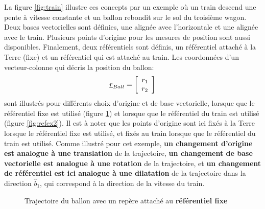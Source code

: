 La figure \ref{fig:train} illustre ces concepts par un exemple où un train descend une pente à vitesse constante et un ballon rebondit sur le sol du troisième wagon. Deux bases vectorielles sont définies, une alignée avec l'horizontale et une alignée avec le train. Plusieurs points d'origine pour les mesures de position sont aussi disponibles. Finalement, deux référentiels sont définis, un référentiel attaché à la Terre (fixe) et un référentiel qui est attaché au train. Les coordonnées d'un vecteur-colonne qui décris la position du ballon:
\begin{equation}
\underline{r}_{Ball} = \left[ \begin{array}{c} r_1 \\ r_2 \end{array} \right]
\end{equation}
sont illustrés pour différents choix d'origine et de base vectorielle, lorsque que le référentiel fixe est utilisé (figure \ref{fig:refex1}) et lorsque que le référentiel du train est utilisé (figure \ref{fig:refex2}). Il est à noter que les points d'origine sont ici fixés à la Terre lorsque le référentiel fixe est utilisé, et fixés au train lorsque que le référentiel du train est utilisé. Comme illustré pour cet exemple, \textbf{un changement d'origine est analogue à une translation} de la trajectoire, \textbf{un changement de base vectorielle est analogue à une rotation} de la trajectoire, et \textbf{un changement de référentiel est ici analogue à une dilatation} de la trajectoire dans la direction $\hat{b}_1$, qui correspond à la direction de la vitesse du train. 

\begin{figure}[p]
        \centering
         \hspace{20pt}
				 \hspace{190pt}
				 \hspace{20pt}
        \caption{Trajectoire du ballon avec un repère attaché au \textbf{référentiel fixe}}
				\label{fig:refex1}
\end{figure}


